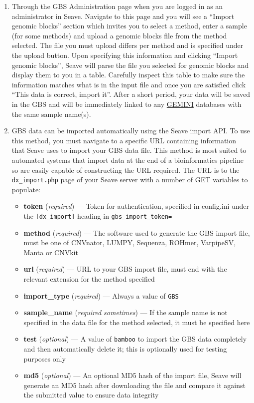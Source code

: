 \documentclass[11pt, a4paper]{article}
\newcommand{\GEMINI}{\href{https://gemini.readthedocs.io}{GEMINI} } %
\begin{document}
\begin{enumerate}
	\item Through the GBS Administration page when you are logged in as an administrator in Seave. Navigate to this page and you will see a ``Import genomic blocks'' section which invites you to select a method, enter a sample (for some methods) and upload a genomic blocks file from the method selected. The file you must upload differs per method and is specified under the upload button. Upon specifying this information and clicking ``Import genomic blocks'', Seave will parse the file you selected for genomic blocks and display them to you in a table. Carefully inspect this table to make sure the information matches what is in the input file and once you are satisfied click ``This data is correct, import it''. After a short period, your data will be saved in the GBS and will be immediately linked to any \GEMINI databases with the same sample name(s).
	\item GBS data can be imported automatically using the Seave import API. To use this method, you must navigate to a specific URL containing information that Seave uses to import your GBS data file. This method is most suited to automated systems that import data at the end of a bioinformatics pipeline so are easily capable of constructing the URL required. The URL is to the \texttt{dx\_import.php} page of your Seave server with a number of GET variables to populate:
	\begin{itemize}
		\item \textbf{token} (\textit{required}) --- Token for authentication, specified in config.ini under the \texttt{[dx\_import]} heading in \texttt{gbs\_import\_token=}
		\item \textbf{method} (\textit{required}) --- The software used to generate the GBS import file, must be one of CNVnator, LUMPY, Sequenza, ROHmer, VarpipeSV, Manta or CNVkit
		\item \textbf{url} (\textit{required}) --- URL to your GBS import file, must end with the relevant extension for the method specified
		\item \textbf{import\_type} (\textit{required}) --- Always a value of \texttt{GBS}
		\item \textbf{sample\_name} (\textit{required sometimes}) --- If the sample name is not specified in the data file for the method selected, it must be specified here
		\item \textbf{test} (\textit{optional}) --- A value of \texttt{bamboo} to import the GBS data completely and then automatically delete it; this is optionally used for testing purposes only
		\item \textbf{md5} (\textit{optional}) --- An optional MD5 hash of the import file, Seave will generate an MD5 hash after downloading the file and compare it against the submitted value to ensure data integrity
	\end{itemize}
	

\end{enumerate}
\end{document}
